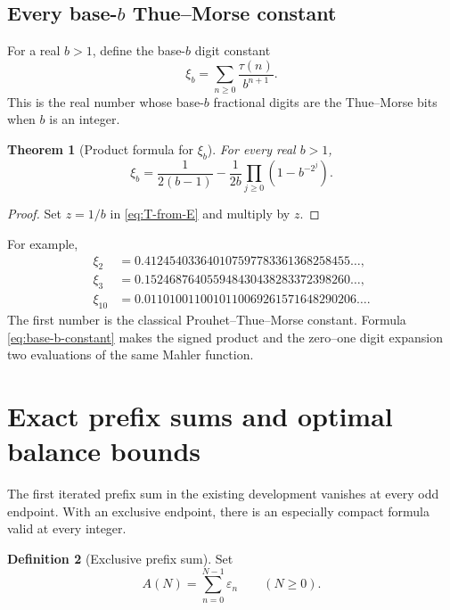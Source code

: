 \documentclass[11pt,oneside]{article}
\newtheorem{theorem}{Theorem}[section]
\theoremstyle{definition}
\newtheorem{definition}[theorem]{Definition}
\theoremstyle{remark}
\begin{document}
\subsection{Every base-\texorpdfstring{\(b\)}{b} Thue--Morse constant}

For a real \(b>1\), define the base-\(b\) digit constant
\begin{equation}
 \xi_b=\sum_{n\ge0}\frac{\tau(n)}{b^{n+1}}.
 \label{eq:xi-b-def}
\end{equation}
This is the real number whose base-\(b\) fractional digits are the Thue--Morse
bits when \(b\) is an integer.

\begin{theorem}[Product formula for \(\xi_b\)]
\label{thm:base-b-constant}
For every real \(b>1\),
\begin{equation}
 \boxed{\quad
 \xi_b=\frac{1}{2(b-1)}-
       \frac{1}{2b}\prod_{j\ge0}\left(1-b^{-2^j}\right).
 \quad}
 \label{eq:base-b-constant}
\end{equation}
\end{theorem}

\begin{proof}
Set \(z=1/b\) in \eqref{eq:T-from-E} and multiply by \(z\).
\end{proof}

For example,
\begin{align*}
 \xi_2&=0.412454033640107597783361368258455\ldots,\\
 \xi_3&=0.152468764055948430438283372398260\ldots,\\
 \xi_{10}&=0.0110100110010110069261571648290206\ldots.
\end{align*}
The first number is the classical Prouhet--Thue--Morse constant.  Formula
\eqref{eq:base-b-constant} makes the signed product and the zero--one digit
expansion two evaluations of the same Mahler function.

\section{Exact prefix sums and optimal balance bounds}
\label{sec:prefix}

The first iterated prefix sum in the existing development vanishes at every
odd endpoint.  With an exclusive endpoint, there is an especially compact
formula valid at every integer.

\begin{definition}[Exclusive prefix sum]
\label{def:A-prefix}
Set
\begin{equation}
 A(N)=\sum_{n=0}^{N-1}\varepsilon_n
 \qquad(N\ge0).
 \label{eq:A-def}
\end{equation}
\end{definition}
\end{document}
